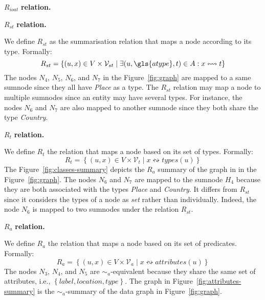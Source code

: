 \begin{labeling}{$R_{ioat}$ \textbf{relation.}}
\item[$R_{st}$ \textbf{relation.}]

We define $R_{st}$ as the summarisation relation that maps a node according to its type. Formally:
$$
R_{st} = \left\lbrace (u, x) \in V \times \mathcal{V}_{st} \mid \exists (u,\gls{atype},t) \in A : x \leftrightsquigarrow t \right\rbrace
$$
The nodes $N_4$, $N_5$, $N_6$, and $N_7$ in the Figure~\ref{fig:graph} are mapped to a same sumnode since they all have \emph{Place} as a type. The $R_{st}$ relation may map a node to multiple sumnodes since an entity may have several types. For instance, the nodes $N_6$ and $N_7$ are also mapped to another sumnode since they both share the type \emph{Country}.

\item[$R_t$ \textbf{relation.}]

We define $R_t$ the relation that maps a node based on its set of types. Formally:
$$
R_t = \left\lbrace (u, x) \in V \times \mathcal{V}_t \mid x \leftrightsquigarrow types(u) \right\rbrace
$$
The Figure~\ref{fig:classes-summary} depicts the $R_a$ summary of the graph in in the Figure~\ref{fig:graph}. The nodes $N_6$ and $N_7$ are mapped to the sumnode $H_4$ because they are both associated with the types \emph{Place} and \emph{Country}. It differs from $R_{st}$ since it considers the types of a node as \emph{set} rather than individually. Indeed, the node $N_6$ is mapped to two sumnodes under the relation $R_{st}$.

\item[$R_a$ \textbf{relation.}]

We define $R_a$ the relation that maps a node based on its set of predicates. Formally:
$$
R_a = \left\lbrace (u, x) \in V \times \mathcal{V}_a \mid x \leftrightsquigarrow attributes(u) \right\rbrace
$$
The nodes $N_3$, $N_4$, and $N_5$ are $\sim_a$-equivalent because they share the same set of attributes, i.e., $\left\lbrace label, location, type \right\rbrace$. The graph in Figure~\ref{fig:attributes-summary} is the $\sim_a$-summary of the data graph in Figure~\ref{fig:graph}.


\end{labeling}
